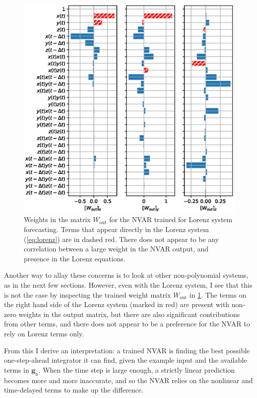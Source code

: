 \begin{figure}
  \includegraphics[width=\textwidth]{figures/nvar-predict-lorenz-wout}
  \caption{Weights in the matrix $W_\text{out}$ for the NVAR trained
    for Lorenz system forecasting. Terms that appear directly in the
    Lorenz system (\cref{eq:lorenz}) are in dashed red. There does not appear
    to be any correlation between a large weight in the NVAR output,
    and presence in the Lorenz equations.}
  \label{fig:nvar-predict-lorenz-wout}
\end{figure}

Another way to allay these concerns is to look at other non-polynomial
systems, as in the next few sections. However, even with the Lorenz
system, I see that this is not the case by inspecting the trained
weight matrix $W_\text{out}$ in
\cref{fig:nvar-predict-lorenz-wout}. The terms on the right hand side
of the Lorenz system (marked in red) are present with non-zero weights
in the output matrix, but there are also significant contributions
from other terms, and there does not appear to be a preference for the
NVAR to rely on Lorenz terms only.

From this I derive an interpretation: a trained NVAR is finding the
best possible one-step-ahead integrator it can find, given the example
input and the available terms in $\bm{g}_\text{n}$. When the time step
is large enough, a strictly linear prediction becomes more and more
inaccurate, and so the NVAR relies on the nonlinear and time-delayed
terms to make up the difference.

